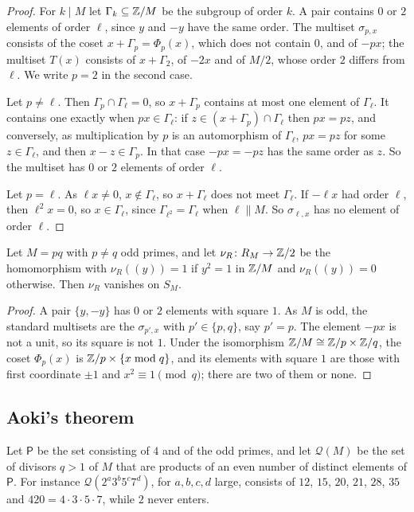 \begin{proof}
For $k\mid M$ let $\Gamma_{k}\subseteq\mathbb{Z}/M$ be the subgroup of order $k$. A
pair contains $0$ or $2$ elements of order $\ell$, since $y$ and $-y$ have
the same order. The multiset $\sigma_{p,x}$ consists of the coset
$x+\Gamma_{p}=\Phi_{p}(x)$, which does not contain $0$, and of $-px$; the
multiset $T(x)$ consists of $x+\Gamma_{2}$, of $-2x$ and of $M/2$, whose
order $2$ differs from $\ell$. We write $p=2$ in the second case.

Let $p\ne\ell$. Then $\Gamma_{p}\cap\Gamma_{\ell}=0$, so $x+\Gamma_{p}$
contains at most one element of $\Gamma_{\ell}$. It contains one exactly when
$px\in\Gamma_{\ell}$: if $z\in(x+\Gamma_{p})\cap\Gamma_{\ell}$ then $px=pz$,
and conversely, as multiplication by $p$ is an automorphism of
$\Gamma_{\ell}$, $px=pz$ for some $z\in\Gamma_{\ell}$, and then
$x-z\in\Gamma_{p}$. In that case $-px=-pz$ has the same order as $z$. So the
multiset has $0$ or $2$ elements of order $\ell$.

Let $p=\ell$. As $\ell x\ne0$, $x\notin\Gamma_{\ell}$, so $x+\Gamma_{\ell}$
does not meet $\Gamma_{\ell}$. If $-\ell x$ had order $\ell$, then
$\ell^{2}x=0$, so $x\in\Gamma_{\ell}$, since $\Gamma_{\ell^{2}}=\Gamma_{\ell}$
when $\ell\parallel M$. So $\sigma_{\ell,x}$ has no element of order $\ell$.
\end{proof}

\begin{lemma}\label{lem:nusqrt}
Let $M=pq$ with $p\ne q$ odd primes, and let $\nu_{R}\colon R_{M}\to\mathbb{Z}/2$
be the homomorphism with $\nu_{R}((y))=1$ if $y^{2}=1$ in $\mathbb{Z}/M$ and
$\nu_{R}((y))=0$ otherwise. Then $\nu_{R}$ vanishes on $S_{M}$.
\end{lemma}

\begin{proof}
A pair $\{y,-y\}$ has $0$ or $2$ elements with square $1$. As $M$ is odd,
the standard multisets are the $\sigma_{p',x}$ with $p'\in\{p,q\}$, say
$p'=p$. The element $-px$ is not a unit, so its square is not $1$. Under the
isomorphism $\mathbb{Z}/M\cong\mathbb{Z}/p\times\mathbb{Z}/q$, the coset $\Phi_{p}(x)$ is
$\mathbb{Z}/p\times\{x\bmod q\}$, and its elements with square $1$ are those with
first coordinate $\pm1$ and $x^{2}\equiv1\pmod q$; there are two of them or
none.
\end{proof}

\subsection{Aoki's theorem}
Let $\mathsf P$ be the set consisting of $4$ and of the odd primes, and let
$\mathcal Q(M)$ be the set of divisors $q>1$ of $M$ that are products of an
even number of distinct elements of $\mathsf P$. For instance
$\mathcal Q(2^{a}3^{b}5^{c}7^{d})$, for $a,b,c,d$ large, consists of $12$,
$15$, $20$, $21$, $28$, $35$ and $420=4\cdot3\cdot5\cdot7$, while $2$ never
enters.

